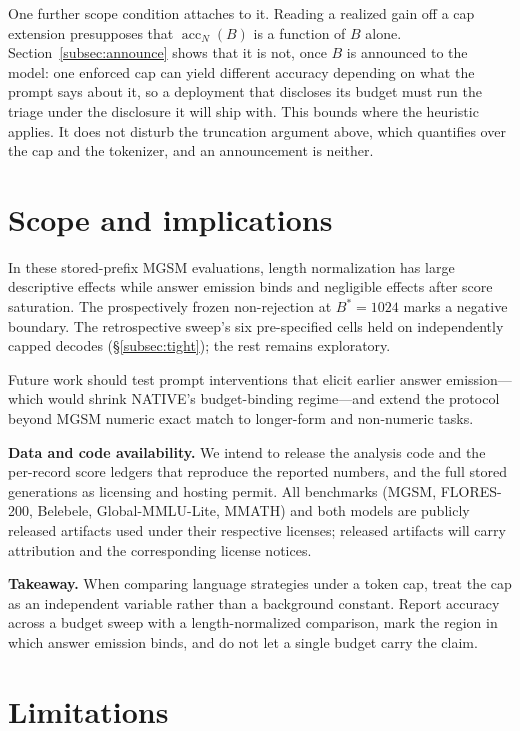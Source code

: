 \documentclass[11pt]{article}
\begin{document}
One further scope condition attaches to it. Reading a realized gain off a cap
extension presupposes that \(\operatorname{acc}_N(B)\) is a function of \(B\)
alone. Section~\ref{subsec:announce} shows that it is not, once \(B\) is
announced to the model: one enforced cap can yield different accuracy depending
on what the prompt says about it, so a deployment that discloses its budget
must run the triage under the disclosure it will ship with. This bounds where
the heuristic applies. It does not disturb the truncation argument above, which
quantifies over the cap and the tokenizer, and an announcement is neither.

\section{Scope and implications}
\label{sec:scope}

In these stored-prefix MGSM evaluations, length normalization has large descriptive effects while answer emission binds and negligible effects after score saturation. The prospectively frozen non-rejection at \(B^*=1024\) marks a negative boundary. The retrospective sweep's six pre-specified cells held on independently capped decodes (\S\ref{subsec:tight}); the rest remains exploratory.

Future work should test prompt interventions that elicit earlier answer emission---which would shrink NATIVE's budget-binding regime---and extend the protocol beyond MGSM numeric exact match to longer-form and non-numeric tasks.

\textbf{Data and code availability.} We intend to release the analysis code and the per-record score ledgers that reproduce the reported numbers, and the full stored generations as licensing and hosting permit. All benchmarks (MGSM, FLORES-200, Belebele, Global-MMLU-Lite, MMATH) and both models are publicly released artifacts used under their respective licenses; released artifacts will carry attribution and the corresponding license notices.

\textbf{Takeaway.} When comparing language strategies under a token cap, treat the cap as an independent variable rather than a background constant. Report accuracy across a budget sweep with a length-normalized comparison, mark the region in which answer emission binds, and do not let a single budget carry the claim.

\section*{Limitations}
\end{document}
